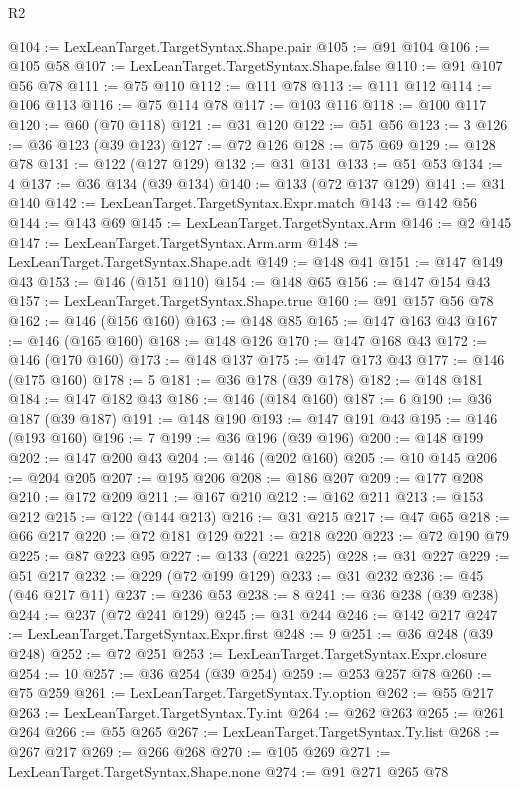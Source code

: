 \begin{lexlean}{R2}
\begin{coremodule}
@104 := LexLeanTarget.TargetSyntax.Shape.pair
@105 := @91 @104
@106 := @105 @58
@107 := LexLeanTarget.TargetSyntax.Shape.false
@110 := @91 @107 @56 @78
@111 := @75 @110
@112 := @111 @78
@113 := @111 @112
@114 := @106 @113
@116 := @75 @114 @78
@117 := @103 @116
@118 := @100 @117
@120 := @60 (@70 @118)
@121 := @31 @120
@122 := @51 @56
@123 := 3
@126 := @36 @123 (@39 @123)
@127 := @72 @126
@128 := @75 @69
@129 := @128 @78
@131 := @122 (@127 @129)
@132 := @31 @131
@133 := @51 @53
@134 := 4
@137 := @36 @134 (@39 @134)
@140 := @133 (@72 @137 @129)
@141 := @31 @140
@142 := LexLeanTarget.TargetSyntax.Expr.match
@143 := @142 @56
@144 := @143 @69
@145 := LexLeanTarget.TargetSyntax.Arm
@146 := @2 @145
@147 := LexLeanTarget.TargetSyntax.Arm.arm
@148 := LexLeanTarget.TargetSyntax.Shape.adt
@149 := @148 @41
@151 := @147 @149 @43
@153 := @146 (@151 @110)
@154 := @148 @65
@156 := @147 @154 @43
@157 := LexLeanTarget.TargetSyntax.Shape.true
@160 := @91 @157 @56 @78
@162 := @146 (@156 @160)
@163 := @148 @85
@165 := @147 @163 @43
@167 := @146 (@165 @160)
@168 := @148 @126
@170 := @147 @168 @43
@172 := @146 (@170 @160)
@173 := @148 @137
@175 := @147 @173 @43
@177 := @146 (@175 @160)
@178 := 5
@181 := @36 @178 (@39 @178)
@182 := @148 @181
@184 := @147 @182 @43
@186 := @146 (@184 @160)
@187 := 6
@190 := @36 @187 (@39 @187)
@191 := @148 @190
@193 := @147 @191 @43
@195 := @146 (@193 @160)
@196 := 7
@199 := @36 @196 (@39 @196)
@200 := @148 @199
@202 := @147 @200 @43
@204 := @146 (@202 @160)
@205 := @10 @145
@206 := @204 @205
@207 := @195 @206
@208 := @186 @207
@209 := @177 @208
@210 := @172 @209
@211 := @167 @210
@212 := @162 @211
@213 := @153 @212
@215 := @122 (@144 @213)
@216 := @31 @215
@217 := @47 @65
@218 := @66 @217
@220 := @72 @181 @129
@221 := @218 @220
@223 := @72 @190 @79
@225 := @87 @223 @95
@227 := @133 (@221 @225)
@228 := @31 @227
@229 := @51 @217
@232 := @229 (@72 @199 @129)
@233 := @31 @232
@236 := @45 (@46 @217 @11)
@237 := @236 @53
@238 := 8
@241 := @36 @238 (@39 @238)
@244 := @237 (@72 @241 @129)
@245 := @31 @244
@246 := @142 @217
@247 := LexLeanTarget.TargetSyntax.Expr.first
@248 := 9
@251 := @36 @248 (@39 @248)
@252 := @72 @251
@253 := LexLeanTarget.TargetSyntax.Expr.closure
@254 := 10
@257 := @36 @254 (@39 @254)
@259 := @253 @257 @78
@260 := @75 @259
@261 := LexLeanTarget.TargetSyntax.Ty.option
@262 := @55 @217
@263 := LexLeanTarget.TargetSyntax.Ty.int
@264 := @262 @263
@265 := @261 @264
@266 := @55 @265
@267 := LexLeanTarget.TargetSyntax.Ty.list
@268 := @267 @217
@269 := @266 @268
@270 := @105 @269
@271 := LexLeanTarget.TargetSyntax.Shape.none
@274 := @91 @271 @265 @78

\end{coremodule}
\end{lexlean}
